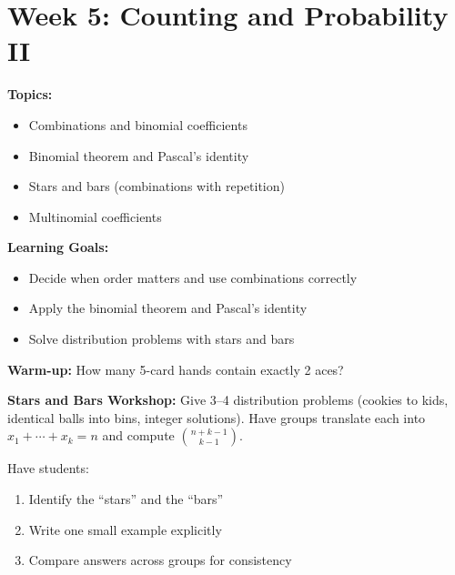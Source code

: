 \documentclass[11pt]{article}
\begin{document}
\newpage
\section{Week 5: Counting and Probability II}

\begin{classabox}
\textbf{Topics:}
\begin{itemize}
    \item Combinations and binomial coefficients
    \item Binomial theorem and Pascal's identity
    \item Stars and bars (combinations with repetition)
    \item Multinomial coefficients
\end{itemize}

\textbf{Learning Goals:}
\begin{itemize}
    \item Decide when order matters and use combinations correctly
    \item Apply the binomial theorem and Pascal's identity
    \item Solve distribution problems with stars and bars
\end{itemize}

\textbf{Warm-up:} How many 5-card hands contain exactly 2 aces?
\end{classabox}

\begin{activitybox}
\textbf{Stars and Bars Workshop:} Give 3--4 distribution problems (cookies to kids, identical balls into bins, integer solutions). Have groups translate each into $x_1 + \cdots + x_k = n$ and compute $\binom{n+k-1}{k-1}$.

Have students:
\begin{enumerate}
    \item Identify the ``stars'' and the ``bars''
    \item Write one small example explicitly
    \item Compare answers across groups for consistency
\end{enumerate}
\end{activitybox}
\end{document}
